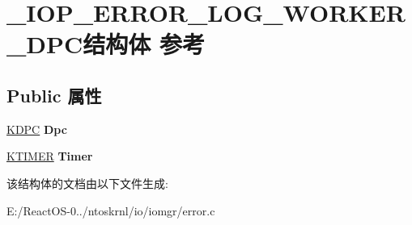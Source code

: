 \hypertarget{struct___i_o_p___e_r_r_o_r___l_o_g___w_o_r_k_e_r___d_p_c}{}\section{\+\_\+\+I\+O\+P\+\_\+\+E\+R\+R\+O\+R\+\_\+\+L\+O\+G\+\_\+\+W\+O\+R\+K\+E\+R\+\_\+\+D\+P\+C结构体 参考}
\label{struct___i_o_p___e_r_r_o_r___l_o_g___w_o_r_k_e_r___d_p_c}
\subsection*{Public 属性}
\begin{DoxyCompactItemize}
\item 
\mbox{\label{struct___i_o_p___e_r_r_o_r___l_o_g___w_o_r_k_e_r___d_p_c_a65dfb746055d83dc7777ea94cde663d6}} 
\hyperlink{struct___k_d_p_c}{K\+D\+PC} {\bfseries Dpc}
\item 
\mbox{\label{struct___i_o_p___e_r_r_o_r___l_o_g___w_o_r_k_e_r___d_p_c_afa8d4f0ddbf1a7254ed609f8ee9cc0cd}} 
\hyperlink{struct___k_t_i_m_e_r}{K\+T\+I\+M\+ER} {\bfseries Timer}
\end{DoxyCompactItemize}


该结构体的文档由以下文件生成\+:\begin{DoxyCompactItemize}
\item 
E\+:/\+React\+O\+S-\/0../ntoskrnl/io/iomgr/error.\+c\end{DoxyCompactItemize}

